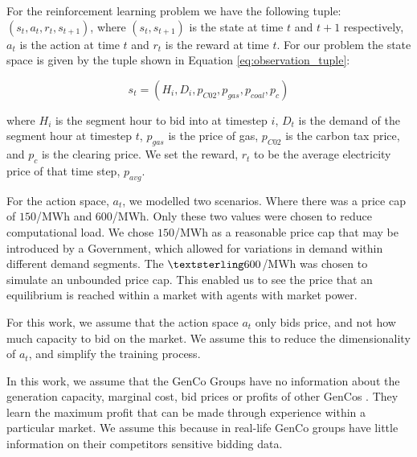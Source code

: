 \documentclass[conference]{IEEEtran}
\begin{document}
For the reinforcement learning problem we have the following tuple: $(s_t,a_t,r_t,s_{t+1})$, where $(s_t, s_{t+1})$ is the state at time $t$ and $t+1$ respectively, $a_t$ is the action at time $t$ and $r_t$ is the reward at time $t$. For our problem the state space is given by the tuple shown in Equation \ref{eq:observation_tuple}:

\begin{equation}
\label{eq:observation_tuple}
	s_t=(H_i,D_i,p_{C02},p_{gas},p_{coal},p_{c})
\end{equation}

\noindent where $H_i$ is the segment hour to bid into at timestep $i$, $D_t$ is the demand of the segment hour at timestep $t$, $p_{gas}$ is the price of gas, $p_{C02}$ is the carbon tax price, and $p_{c}$ is the clearing price. We set the reward, $r_t$ to be the average electricity price of that time step, $p_{avg}$.

For the action space, $a_t$, we modelled two scenarios. Where there was a price cap of \textsterling$150$/MWh and \textsterling$600$/MWh. Only these two values were chosen to reduce computational load. We chose \textsterling$150$/MWh as a reasonable price cap that may be introduced by a Government, which allowed for variations in demand within different demand segments. The $\textsterling 600$/MWh was chosen to simulate an unbounded price cap. This enabled us to see the price that an equilibrium is reached within a market with agents with market power. 

For this work, we assume that the action space $a_t$ only bids price, and not how much capacity to bid on the market. We assume this to reduce the dimensionality of $a_t$, and simplify the training process.

In this work, we assume that the GenCo Groups have no information about the generation capacity, marginal cost, bid prices or profits of other GenCos \cite{EsmaeiliAliabadi2017}. They learn the maximum profit that can be made through experience within a particular market. We assume this because in real-life GenCo groups have little information on their competitors sensitive bidding data.

\end{document}
